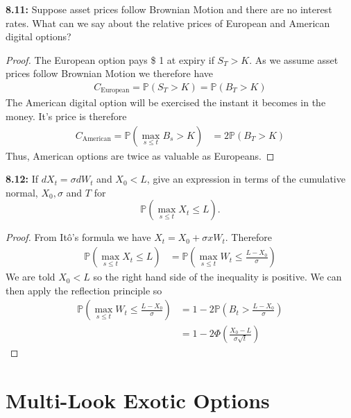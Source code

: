 \documentclass{article}
\begin{document}
\begin{tcolorbox}[colframe=black,colback=gray!5,boxrule=0.5pt]
\textbf{8.11:} Suppose asset prices follow Brownian Motion and there are no interest rates. What can we say about the relative prices of European and American digital options? 
\end{tcolorbox}
\begin{proof}
    The European option pays \$ 1 at expiry if $S_T>K$. As we assume asset prices follow Brownian Motion we therefore have
    \begin{align*}
        C_{\text{European}} = \mathbb{P}(S_T>K) = \mathbb{P}(B_T>K)
    \end{align*}
    The American digital option will be exercised the instant it becomes in the money. It's price is therefore 
    \begin{align*}
        C_{\text{American}} = \mathbb{P}\left(\max_{s\leq t}B_s > K\right) &= 2\mathbb{P}(B_T>K)
    \end{align*}
    Thus, American options are twice as valuable as Europeans.
\end{proof}

\begin{tcolorbox}[colframe=black,colback=gray!5,boxrule=0.5pt]
\textbf{8.12:} If $dX_t = \sigma dW_t$ and $X_0 < L$, give an expression in terms of the cumulative normal, $X_0, \sigma$ and $T$ for 
$$\mathbb{P}\left(\max_{s\leq t} X_t\leq L\right).$$
\end{tcolorbox}
\begin{proof} From Itô's formula we have $X_t = X_0 + \sigma xW_t$. Therefore 
\begin{align*}
    \mathbb{P}\left(\max_{s\leq t} X_t\leq L\right) &= \mathbb{P}\left(\max_{s\leq t} W_t\leq \frac{L-X_0}{\sigma}\right)
\end{align*}
    We are told $X_0 < L$ so the right hand side of the inequality is positive. We can then apply the reflection principle so 
\begin{align*}
    \mathbb{P}\left(\max_{s\leq t} W_t\leq \frac{L-X_0}{\sigma}\right) &= 1-2\mathbb{P}\left(B_t>\frac{L-X_0}{\sigma}\right) \\
    &=1 - 2\Phi\left(\frac{X_0-L}{\sigma\sqrt{t}}\right)
\end{align*}
\end{proof}


\newpage
\section{Multi-Look Exotic Options}


\newpage
 
\end{document}
